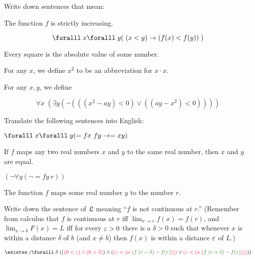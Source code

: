 \begin{problem}
  \step
  \begin{enumalph}
    \item Write down sentences that mean:
      \begin{enumroman}
        \item The function $f$ is strictly increasing.
        \begin{Answer}
          \[ \forall x \forall y (\; (x < y) \lto (f(x) < f(y))\;) \]
        \end{Answer}
        \item Every square is the absolute value of some number.
        \begin{Answer}
          \step
          For any $x$, we define $x^2$ to be an abbreviation for $x \cdot x$.

          \step
          For any $x, y$, we define 

          \[ \forall x \; ( \exists y (\lnot (((x^2 - ay) < 0) \lor ((ay - x^2) < 0)))) \]
        \end{Answer}
      \end{enumroman}
    \item Translate the following sentences into English:
      \begin{enumroman}
        \item $\forall x \forall y (= fx\ fy \lto = x y)$
          \begin{Answer}
            If $f$ maps any two real numbers $x$ and $y$
            to the same real number,
            then $x$ and $y$ are equal.
          \end{Answer}
        \item $(\lnot \forall y (\lnot = fy\ r))$
          \begin{Answer}
            The function $f$ maps some real number $y$ to the number $r$.
          \end{Answer}
      \end{enumroman}
    \item Write down the sentence of $\mathfrak{L}$ meaning
      ``$f$ is not continuous at $r$.''
      (Remember from calculus that $f$ is continuous at $r$ iff
      $\lim_{x \to r} f(x) = f(r)$, and $\lim_{x \to b} F(x) = L$
      iff for every $\varepsilon > 0$ there is a $\delta > 0$ such that
      whenever $x$ is within a distance $\delta$ of $b$
      (and $x \ne b$) then $f(x)$ is within a distance $\varepsilon$ of $L$.)
      \begin{Answer}
        \[ \exists \eps \forall \delta \; ( (\crim{(0 < \eps) \land (0 < \delta)}) \land (\crim{(\eps < (a\; (\green{f\; (r - \delta) - f(r)})))} \lor \crim{(\eps < (a\; (\green{f\; (r + \delta) - f(r)})))})) \]
      \end{Answer}
  \end{enumalph}
\end{problem}

